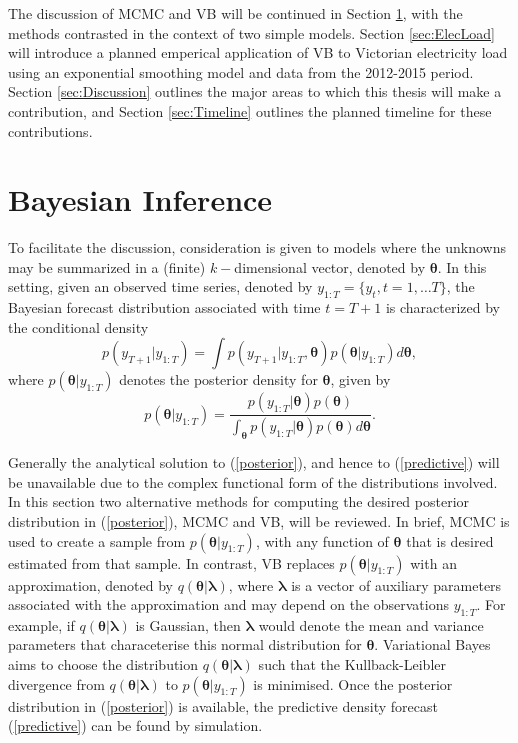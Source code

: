 \documentclass[12pt,a4paper]{article}%
\numberwithin{equation}{section}
\begin{document}
The discussion of MCMC and VB will be continued in Section \ref{sec:BayesInf}, with the methods contrasted in the context of two simple models. Section \ref{sec:ElecLoad} will introduce a planned emperical application of VB to Victorian electricity load using an exponential smoothing model and data from the 2012-2015 period. Section \ref{sec:Discussion} outlines the major areas to which this thesis will make a contribution, and Section \ref{sec:Timeline} outlines the planned timeline for these contributions.

\section{Bayesian Inference} \label{sec:BayesInf}

To facilitate the discussion, consideration is given to models where the unknowns may be summarized in a (finite) $k-$dimensional vector, denoted by $\boldsymbol{\theta}.$ In this setting, given an observed time series, denoted by $y_{1:T}= \{y_{t}, t = 1, \dots T\}$, the Bayesian forecast distribution associated with time $t=T+1$ is characterized by the conditional density
\begin{equation}
\label{predictive}
p(y_{T+1} | y_{1:T}) =\int p(y_{T+1}|y_{1:T},\boldsymbol{\theta}) p(\boldsymbol{\theta}|y_{1:T}) d\boldsymbol{\theta},
\end{equation}
where $p(\boldsymbol{\theta}|y_{1:T})$ denotes the posterior density for $\boldsymbol{\theta}$, given by
\begin{equation}
\label{posterior}
 p(\boldsymbol{\theta} | y_{1:T}) = \frac{p(y_{1:T}|\boldsymbol{\theta})p(\boldsymbol{\theta})}{\int_{\boldsymbol{\theta}}p(y_{1:T}|\boldsymbol{\theta})p(\boldsymbol{\theta}) d\boldsymbol{\theta}}.
\end{equation}

Generally the analytical solution to (\ref{posterior}), and hence to (\ref{predictive}) will be unavailable due to the complex functional form of the distributions involved. 
In this section two alternative methods for computing the desired posterior distribution in (\ref{posterior}),  MCMC and VB, will be reviewed.
In brief, MCMC is used to create a sample from $p(\boldsymbol{\theta} | y_{1:T})$, with any function of $\boldsymbol{\theta}$ that is desired estimated from that sample. In contrast, VB replaces $p(\boldsymbol{\theta} | y_{1:T})$ with an approximation, denoted by $q(\boldsymbol{\theta} | \boldsymbol{\lambda})$, where $\boldsymbol{\lambda}$ is a vector of auxiliary parameters associated with the approximation and may depend on the observations $y_{1:T}$.
For example, if $q(\boldsymbol{\theta} | \boldsymbol{\lambda})$ is Gaussian, then $\boldsymbol{\lambda}$ would denote the mean and variance parameters that characeterise this normal distribution for $\boldsymbol{\theta}$.  Variational Bayes aims to choose the distribution $q(\boldsymbol{\theta} | \boldsymbol{\lambda})$ such that the Kullback-Leibler divergence from $q(\boldsymbol{\theta} | \boldsymbol{\lambda})$ to $p(\boldsymbol{\theta} | y_{1:T})$ is minimised. Once the posterior distribution in (\ref{posterior}) is available, the predictive density forecast (\ref{predictive}) can be found by simulation.
\end{document}
